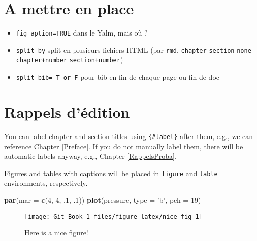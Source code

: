 \documentclass[]{book}
\newenvironment{Shaded}{\begin{snugshade}}{\end{snugshade}}
\newcommand{\DataTypeTok}[1]{\textcolor[rgb]{0.13,0.29,0.53}{#1}}
\newcommand{\DecValTok}[1]{\textcolor[rgb]{0.00,0.00,0.81}{#1}}
\newcommand{\FloatTok}[1]{\textcolor[rgb]{0.00,0.00,0.81}{#1}}
\newcommand{\KeywordTok}[1]{\textcolor[rgb]{0.13,0.29,0.53}{\textbf{#1}}}
\newcommand{\NormalTok}[1]{#1}
\newcommand{\StringTok}[1]{\textcolor[rgb]{0.31,0.60,0.02}{#1}}
\providecommand{\tightlist}{%
  \setlength{\itemsep}{0pt}\setlength{\parskip}{0pt}}
\begin{document}
\hypertarget{a-mettre-en-place}{%
\section{A mettre en place}\label{a-mettre-en-place}}

\begin{itemize}
\tightlist
\item
  \texttt{fig\_aption=TRUE} dans le Yalm, mais où ?
\item
  \texttt{split\_by} split en plusieurs fichiers HTML (par \texttt{rmd}, \texttt{chapter} \texttt{section} \texttt{none} \texttt{chapter+number} \texttt{section+number})
\item
  \texttt{split\_bib=\ T\ or\ F} pour bib en fin de chaque page ou fin de doc
\end{itemize}

\hypertarget{rappels-dedition}{%
\section{Rappels d'édition}\label{rappels-dedition}}

You can label chapter and section titles using \texttt{\{\#label\}} after them, e.g., we can reference Chapter \ref{Preface}. If you do not manually label them, there will be automatic labels anyway, e.g., Chapter \ref{RappelsProba}.

Figures and tables with captions will be placed in \texttt{figure} and \texttt{table} environments, respectively.

\begin{Shaded}
\begin{Highlighting}[]
\KeywordTok{par}\NormalTok{(}\DataTypeTok{mar =} \KeywordTok{c}\NormalTok{(}\DecValTok{4}\NormalTok{, }\DecValTok{4}\NormalTok{, }\FloatTok{.1}\NormalTok{, }\FloatTok{.1}\NormalTok{))}
\KeywordTok{plot}\NormalTok{(pressure, }\DataTypeTok{type =} \StringTok{'b'}\NormalTok{, }\DataTypeTok{pch =} \DecValTok{19}\NormalTok{)}
\end{Highlighting}
\end{Shaded}

\begin{figure}

{\centering \texttt{[image: Git\_Book\_1\_files/figure-latex/nice-fig-1]} 

}

\caption{Here is a nice figure!}\label{fig:nice-fig}
\end{figure}
\end{document}

